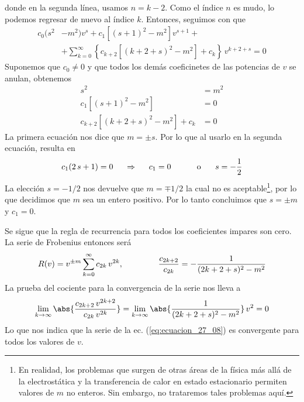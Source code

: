 donde en la segunda línea, usamos $n = k -2$. Como el índice $n$ es mudo, lo podemos regresar de nuevo al índice $k$. Entonces, seguimos con que
\begin{align*}
c_{0}(s^{2} &- m^{2}) v^{s} + c_{1} [(s + 1)^{2}- m^{2}] v^{s+1} + \\
&+ \sum_{k=0}^{\infty} \left\{ c_{k+2} [(k + 2 + s)^{2} - m^{2}] + c_{k} \right\} \, v^{k+2+s} = 0
\end{align*}
Suponemos que $c_{0} \neq 0$ y que todos los demás coeficinetes de las potencias de $v$ se anulan, obtenemos
\begin{align*}
s^{2} &= m^{2} \\
c_{1} [(s + 1)^{2}- m^{2}] &= 0\\
c_{k+2} [(k + 2 + s)^{2} - m^{2}] + c_{k} &= 0
\end{align*}
La primera ecuación nos dice que $m = \pm s$. Por lo que al usarlo en la segunda ecuación, resulta en
\begin{align*}
c_{1} (2 \, s + 1) = 0 \hspace{0.5cm} \Rightarrow \hspace{0.5cm} c_{1} = 0 \hspace{1cm} \mbox{ o } \hspace{0.5cm} s = - \dfrac{1}{2}
\end{align*}
La elección $s = -1/2$ nos devuelve que $m = \mp 1/2$ la cual no es aceptable\footnote{En realidad, los problemas que surgen de otras áreas de la física más allá de la electrostática y la transferencia de calor en estado estacionario permiten valores de $m$ no enteros. Sin embargo, no trataremos tales problemas aquí.}, por lo que decidimos que $m$ sea un entero positivo. Por lo tanto concluimos que $s = \pm m$ y $c_{1} = 0$. 
\par
Se sigue que la regla de recurrencia para todos los coeficientes impares son cero. La serie de Frobenius entonces será
\begin{equation}
R(v) = v^{\pm m} \sum_{k=0}^{\infty} c_{2k} \, v^{2k}, \hspace{1.5cm} \dfrac{c_{2k+2}}{c_{2k}} = - \dfrac{1}{(2k + 2 + s)^{2} - m^{2}}
\label{eq:ecuacion_27_08}
\end{equation}
La prueba del cociente para la convergencia de la serie nos lleva a
\begin{align*}
\lim_{k \to \infty} \abs{\dfrac{c_{2k+2} \, v^{2k+2}}{c_{2k} \, v^{2k}}} = \lim_{k \to \infty} \abs{\dfrac{1}{(2k + 2 + s)^{2} -m^{2}}} \, v^{2} = 0
\end{align*}
Lo que nos indica que la serie de la ec. (\ref{eq:ecuacion_27_08}) es convergente para todos los valores de $v$.
